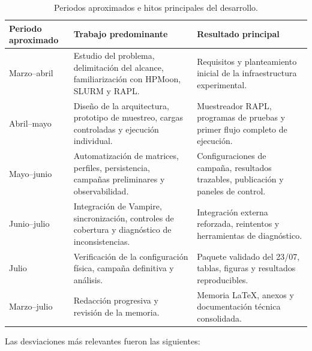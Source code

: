 \begin{table}[H]
    \centering
    \small
    \caption{Periodos aproximados e hitos principales del desarrollo.}
    \label{tab:periodos-desarrollo}
    \begin{tabular}{p{}p{}p{}}
        \hline
        Periodo aproximado & Trabajo predominante & Resultado principal \\
        \hline
        Marzo--abril & Estudio del problema, delimitación del alcance, familiarización con HPMoon, SLURM y RAPL. & Requisitos y planteamiento inicial de la infraestructura experimental. \\
        Abril--mayo & Diseño de la arquitectura, prototipo de muestreo, cargas controladas y ejecución individual. & Muestreador RAPL, programas de pruebas y primer flujo completo de ejecución. \\
        Mayo--junio & Automatización de matrices, perfiles, persistencia, campañas preliminares y observabilidad. & Configuraciones de campaña, resultados trazables, publicación y paneles de control. \\
        Junio--julio & Integración de Vampire, sincronización, controles de cobertura y diagnóstico de inconsistencias. & Integración externa reforzada, reintentos y herramientas de diagnóstico. \\
        Julio & Verificación de la configuración física, campaña definitiva y análisis. & Paquete validado del 23/07, tablas, figuras y resultados reproducibles. \\
        Marzo--julio & Redacción progresiva y revisión de la memoria. & Memoria LaTeX, anexos y documentación técnica consolidada. \\
        \hline
    \end{tabular}
\end{table}

Las desviaciones más relevantes fueron las siguientes:

